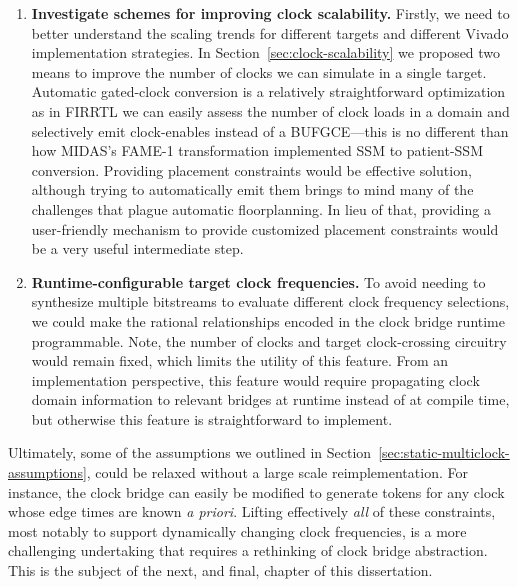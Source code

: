 \begin{enumerate}
\item \textbf{Investigate schemes for improving clock scalability.}
Firstly, we need to better understand the scaling trends for different targets
and different Vivado implementation strategies.  In
Section~\ref{sec:clock-scalability} we proposed two means to improve
the number of clocks we can simulate in a single target. Automatic
gated-clock conversion is a relatively straightforward optimization as
in FIRRTL we can easily assess
the number of clock loads in a domain and selectively emit clock-enables
instead of a BUFGCE---this is no different than how MIDAS's FAME-1 transformation
implemented SSM to patient-SSM conversion. Providing placement constraints
would be effective solution, although trying to automatically emit them brings to mind many of the
challenges that plague automatic floorplanning. In lieu of that, providing a user-friendly mechanism to
provide customized placement constraints would be a very useful intermediate
step.

\item \textbf{Runtime-configurable target clock frequencies.} To avoid needing to
synthesize multiple bitstreams to evaluate different clock frequency
selections, we could make the rational relationships encoded in the clock bridge runtime programmable.
Note, the number of clocks and target clock-crossing circuitry would remain
fixed, which limits the utility of this feature. From an implementation perspective, this feature would require propagating
clock domain information to relevant bridges at runtime instead of at compile time,
but otherwise this feature is straightforward to implement.
\end{enumerate}

Ultimately, some of the assumptions we outlined in
Section~\ref{sec:static-multiclock-assumptions}, could be relaxed without a
large scale reimplementation. For instance, the clock bridge can easily be
modified to generate tokens for any clock whose edge times are known \emph{a priori}.
Lifting effectively \emph{all} of these constraints, most notably to
support dynamically changing clock frequencies, is a more challenging
undertaking that requires a rethinking of clock bridge abstraction. This is the
subject of the next, and final, chapter of this dissertation.

